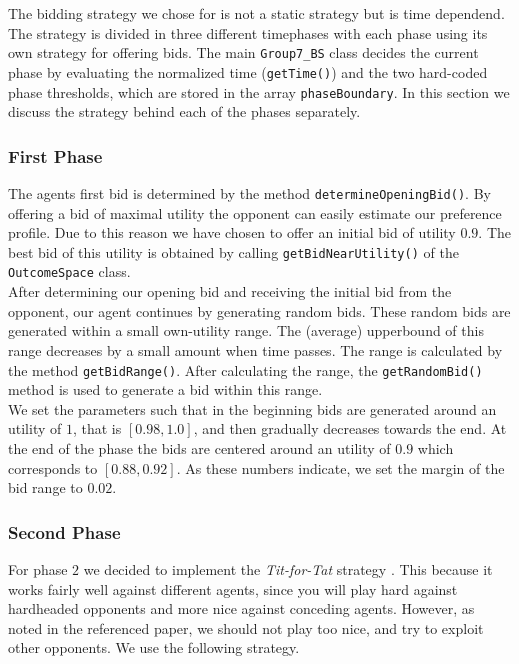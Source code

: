 The bidding strategy we chose for is not a static strategy but is time dependend. The strategy is divided in three different timephases with each phase using its own strategy for offering bids. The main \texttt{Group7\_BS} class decides the current phase by evaluating the normalized time (\texttt{getTime()}) and the two hard-coded phase thresholds, which are stored in the array \texttt{phaseBoundary}. In this section we discuss the strategy behind each of the phases separately.

\subsubsection{First Phase}
The agents first bid is determined by the method \texttt{determineOpeningBid()}. By offering a bid of maximal utility the opponent can easily estimate our preference profile. Due to this reason we have chosen to offer an initial bid of utility $0.9$. The best bid of this utility is obtained by calling \texttt{getBidNearUtility()} of the \texttt{OutcomeSpace} class. \\

After determining our opening bid and receiving the initial bid from the opponent, our agent continues by generating random bids. These random bids are generated within a small own-utility range. The (average) upperbound of this range decreases by a small amount when time passes. The range is calculated by the method \texttt{getBidRange()}. After calculating the range, the \texttt{getRandomBid()} method is used to generate a bid within this range. \\

We set the parameters such that in the beginning bids are generated around an utility of $1$, that is $[0.98, 1.0]$, and then gradually decreases towards the end. At the end of the phase the bids are centered around an utility of $0.9$ which corresponds to $[0.88, 0.92]$. As these numbers indicate, we set the margin of the bid range to $0.02$. 

\subsubsection{Second Phase}

For phase $2$ we decided to implement the \emph{Tit-for-Tat} strategy \cite{titfortat}.
This because it works fairly well against different agents, since you will play
hard against hardheaded opponents and more nice against conceding agents.
However, as noted in the referenced paper, we should not play too nice,
and try to exploit other opponents. We use the following strategy. \\

